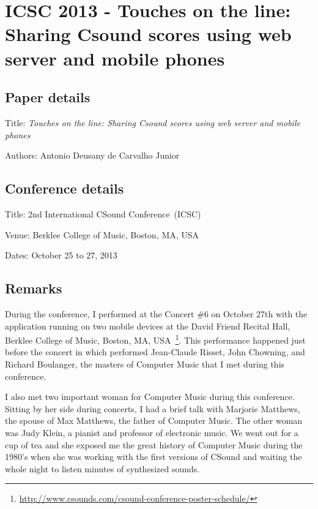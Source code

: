 \section{ICSC 2013 - Touches on the line: Sharing Csound scores using web server and mobile phones}
\label{ape:papericsc2013}

\subsection*{Paper details}

Title: \textit{Touches on the line: Sharing Csound scores using web server and mobile phones}

Authors: Antonio Deusany de Carvalho Junior

\subsection*{Conference details}

Title: 2nd International CSound Conference~(ICSC)

Venue: Berklee College of Music, Boston, MA, USA

Dates: October 25 to 27, 2013

\subsection*{Remarks}

During the conference, I performed at the Concert \#6 on October 27th with the application running on two mobile devices at the David Friend Recital Hall, Berklee College of Music, Boston, MA, USA~\footnote{\url{http://www.csounds.com/csound-conference-poster-schedule/}}.
This performance happened just before the concert in which performed Jean-Claude Risset, John Chowning, and Richard Boulanger, the masters of Computer Music that I met during this conference.

I also met two important woman for Computer Music during this conference.
Sitting by her side during concerts, I had a brief talk with Marjorie Matthews, the spouse of Max Matthews, the father of Computer Music.
The other woman was Judy Klein, a pianist and professor of electronic music.
We went out for a cup of tea and she exposed me the great history of Computer Music during the 1980's when she was working with the first versions of CSound and waiting the whole night to listen minutes of synthesized sounds.




